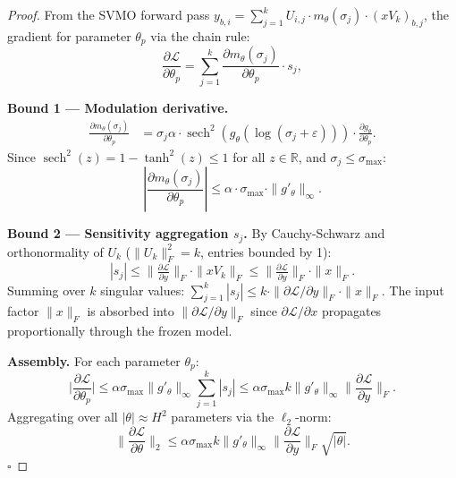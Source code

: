 \documentclass{scpe}
\newcommand{\RR}{\mathbb{R}}
\newcommand{\sech}{\operatorname{sech}}
\begin{document}
\begin{proof}
From the SVMO forward pass $y_{b,i} = \sum_{j=1}^k U_{i,j} \cdot m_\theta(\sigma_j) \cdot (xV_k)_{b,j}$, the gradient for parameter $\theta_p$ via the chain rule:
\begin{equation}
\frac{\partial\mathcal{L}}{\partial\theta_p} = \sum_{j=1}^k \frac{\partial m_\theta(\sigma_j)}{\partial\theta_p} \cdot s_j,
\end{equation}

\textbf{Bound 1 --- Modulation derivative.}
\begin{align}
\frac{\partial m_\theta(\sigma_j)}{\partial\theta_p} &= \sigma_j\alpha \cdot \sech^2(g_\theta(\log(\sigma_j{+}\varepsilon))) \cdot \frac{\partial g_\theta}{\partial\theta_p}.
\end{align}
Since $\sech^2(z) = 1 - \tanh^2(z) \leq 1$ for all $z \in \RR$, and $\sigma_j \leq \sigma_{\max}$:
\begin{equation}
\left|\frac{\partial m_\theta(\sigma_j)}{\partial\theta_p}\right| \leq \alpha \cdot \sigma_{\max} \cdot \|g'_\theta\|_\infty.
\end{equation}

\textbf{Bound 2 --- Sensitivity aggregation $s_j$.}
By Cauchy-Schwarz and orthonormality of $U_k$ ($\|U_k\|_F^2 = k$, entries bounded by 1):
\begin{equation}
|s_j| \leq \big\|\tfrac{\partial\mathcal{L}}{\partial y}\big\|_F \cdot \|xV_k\|_F \leq \big\|\tfrac{\partial\mathcal{L}}{\partial y}\big\|_F \cdot \|x\|_F.
\end{equation}
Summing over $k$ singular values: $\sum_{j=1}^k |s_j| \leq k \cdot \|\partial\mathcal{L}/\partial y\|_F \cdot \|x\|_F$. The input factor $\|x\|_F$ is absorbed into $\|\partial\mathcal{L}/\partial y\|_F$ since $\partial\mathcal{L}/\partial x$ propagates proportionally through the frozen model.

\textbf{Assembly.}
For each parameter $\theta_p$:
\begin{equation}
\Big|\frac{\partial\mathcal{L}}{\partial\theta_p}\Big| \leq \alpha\sigma_{\max} \|g'_\theta\|_\infty \sum_{j=1}^k |s_j| \leq \alpha\sigma_{\max} k \|g'_\theta\|_\infty \Big\|\frac{\partial\mathcal{L}}{\partial y}\Big\|_F.
\end{equation}
Aggregating over all $|\theta| \approx H^2$ parameters via the $\ell_2$-norm:
\begin{equation}
\Big\|\frac{\partial\mathcal{L}}{\partial\theta}\Big\|_2 \leq \alpha\sigma_{\max} k \|g'_\theta\|_\infty \Big\|\frac{\partial\mathcal{L}}{\partial y}\Big\|_F \sqrt{|\theta|}.
\end{equation}
$\square$
\end{proof}
\end{document}
